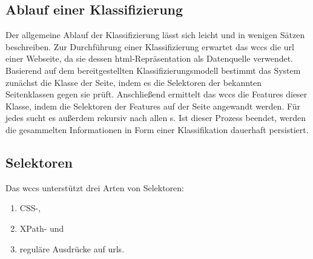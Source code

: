     \subsection{Ablauf einer Klassifizierung}
        \label{section:solutionConceptClassificationAlg}
        Der allgemeine Ablauf der Klassifizierung lässt sich leicht und in wenigen Sätzen beschreiben.
        Zur Durchführung einer Klassifizierung erwartet das \gls{wccs} die \gls{url} einer Webseite,
        da sie dessen \gls{html}-Repräsentation als Datenquelle verwendet.
        Basierend auf dem bereitgestellten Klassifizierungsmodell
        bestimmt das System zunächst die Klasse der Seite,
        indem es die Selektoren der bekannten Seitenklassen gegen sie prüft.
        Anschließend ermittelt das \gls{wccs} die Features dieser Klasse,
        indem die Selektoren der Features auf der Seite angewandt werden.
        Für jedes {\contentFeature} sucht es außerdem rekursiv nach allen {\childFeature}s.
        Ist dieser Prozess beendet, werden die gesammelten Informationen in Form einer Klassifikation
        dauerhaft persistiert.

    \subsection{Selektoren}
        \label{section:conceptSupportedSelectors}
        Das \gls{wccs} unterstützt drei Arten von Selektoren:

        \begin{enumerate}
            \item CSS-,
            \item XPath- und
            \item reguläre Ausdrücke auf \glspl{url}.
        \end{enumerate}

